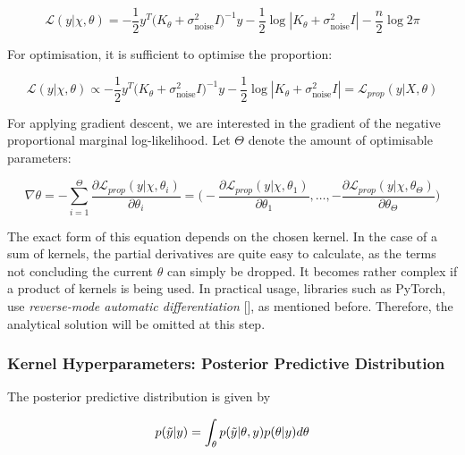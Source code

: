 \documentclass[11pt]{scrartcl}
\begin{document}
\begin{equation}
\label{eq:gp_log_marginal_likelihood}
    \mathcal{L}(y | \chi, \theta) = - \frac{1}{2}y^T \big(K_\theta + \sigma_{\text{noise}}^2I\big)^{-1}y - \frac{1}{2} \log{|K_\theta + \sigma_{\text{noise}}^2I|} - \frac{n}{2} \log{2\pi}
\end{equation}

For optimisation, it is sufficient to optimise the proportion:

\begin{equation}
\label{eq:gp_neg_log_lik}
    \mathcal{L}(y | \chi, \theta) \propto - \frac{1}{2}y^T \big(K_\theta + \sigma_{\text{noise}}^2I\big)^{-1}y - \frac{1}{2} \log{|K_\theta + \sigma_{\text{noise}}^2I|} = \mathcal{L}_{prop}(y | X, \theta)
\end{equation}

For applying gradient descent, we are interested in the gradient of the negative proportional marginal log-likelihood. Let $\Theta$ denote the amount of optimisable parameters:

\begin{equation}
    \nabla \theta = - \sum_{i=1}^{\Theta} \frac{\partial \mathcal{L}_{prop}(y | \chi, \theta_i)}{\partial \theta_i} = \bigg( -\frac{\partial \mathcal{L}_{prop}(y | \chi, \theta_1)}{\partial \theta_1}, \dots, -\frac{\partial \mathcal{L}_{prop}(y | \chi, \theta_\Theta)}{\partial \theta_\Theta} \bigg)
\end{equation}

The exact form of this equation depends on the chosen kernel. In the case of a sum of kernels, the partial derivatives are quite easy to calculate, as the terms not concluding the current $\theta$ can simply be dropped. It becomes rather complex if a product of kernels is being used. In practical usage, libraries such as PyTorch, use \textit{reverse-mode automatic differentiation} [\cite{paszke2019pytorch}], as mentioned before. Therefore, the analytical solution will be omitted at this step.

\subsubsection{Kernel Hyperparameters: Posterior Predictive Distribution} \hfill

The posterior predictive distribution is given by 

\begin{equation}
    p(\Tilde{y}|y) = \int_\theta p(\Tilde{y}|\theta, y) p(\theta|y)d\theta
\end{equation}
\end{document}
